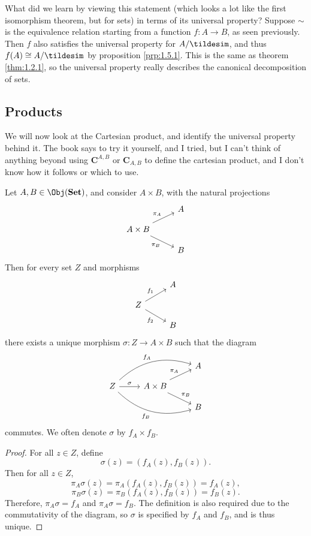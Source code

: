 What did we learn by viewing this statement (which looks a lot like the first isomorphism theorem, but for sets) in terms of its universal property? Suppose $\sim $ is the equivalence relation starting from a function $f : A \to B$, as seen previously. Then $f$ also satisfies the universal property for $A / \tildesim $, and thus $f(A)\cong A /\tildesim $ by proposition \ref{prp:1.5.1}. This is the same as theorem \ref{thm:1.2.1}, so the universal property really describes the canonical decomposition of sets.
\subsection{Products}
We will now look at the Cartesian product, and identify the universal property behind it. The book says to try it yourself, and I tried, but I can't think of anything beyond using $\mathbf{C}^{A,B}$ or $\mathbf{C}_{A,B}$ to define the cartesian product, and I don't know how it follows or which to use.
\begin{proposition}\label{prp:1.5.2}
Let $A,B\in \Obj( \mathbf{Set} ) $, and consider $A\times B$, with the natural projections
\[\begin{tikzcd}[row sep=1em, column sep=2.5em]
	&A\\
	A\times B\arrow[ru,"\pi_A"]\arrow[dr, "\pi_B"']\\
	&B
\end{tikzcd}\]
Then for every set $Z$ and morphisms
\[\begin{tikzcd}[row sep=1em, column sep=2.5em]
	&A\\
	Z\arrow[ur,"f_1"]\arrow[dr,"f_2"']\\
	&B
\end{tikzcd}\]
there exists a unique morphism $\sigma : Z \to A\times B$ such that the diagram
\[\begin{tikzcd}[row sep=1em, column sep=2.5em]
	&&A\\
	Z\arrow[urr, bend left, "f_A"]\arrow[r,"\sigma "]\arrow[drr,bend right,"f_B"']&A\times B\arrow[ur,"\pi_A"]\arrow[dr,"\pi _B"]\\
										      &&B
\end{tikzcd}\]
commutes. We often denote $\sigma $ by $f_A\times f_B$.
\end{proposition}
\begin{proof}
	For all $z\in Z$, define
	\[
		\sigma (z)=(f_A(z),f_B(z))
	.\]
	Then for all $z\in Z$,
	\[
		\pi_A \sigma (z)=\pi _A(f_A(z),f_B(z))=f_A(z),
	\]
	\[
		\pi_B\sigma (z)=\pi_B(f_A(z),f_B(z))=f_B(z)
	.\]
	Therefore, $\pi_A\sigma =f_A$ and $\pi_A\sigma =f_B$. The definition is also required due to the commutativity of the diagram, so $\sigma $ is specified by $f_A$ and $f_B$, and is thus unique.
\end{proof}
